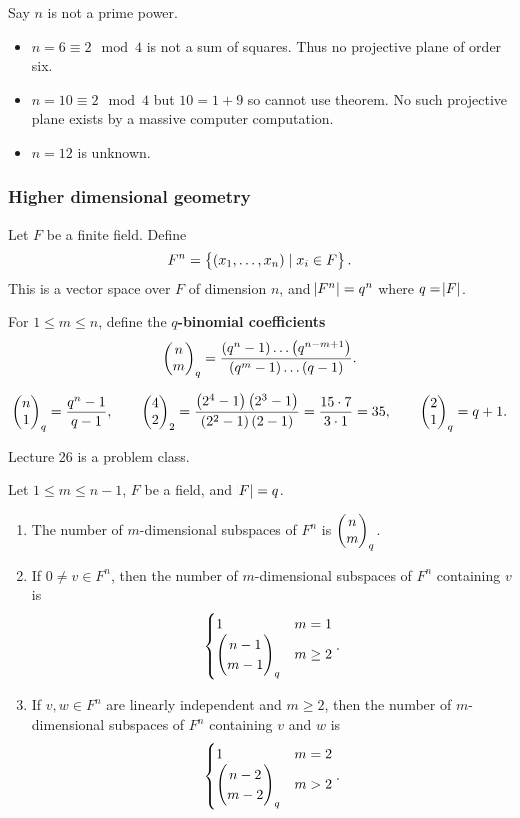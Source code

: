 \begin{example*}
Say $ n $ is not a prime power.
\begin{itemize}
\item $ n = 6 \equiv 2 \mod 4 $ is not a sum of squares. Thus no projective plane of order six.
\item $ n = 10 \equiv 2 \mod 4 $ but $ 10 = 1 + 9 $ so cannot use theorem. No such projective plane exists by a massive computer computation.
\item $ n = 12 $ is unknown.
\end{itemize}
\end{example*}

\pagebreak

\subsubsection{Higher dimensional geometry}

Let $ F $ be a finite field. Define
$$ F^n = \cbr{\br{x_1, \dots, x_n} \mid x_i \in F}. $$
This is a vector space over $ F $ of dimension $ n $, and $ \abs{F^n} = q^n $ where $ q = \abs{F} $.

\begin{definition*}
For $ 1 \le m \le n $, define the \textbf{$ q $-binomial coefficients}
$$ \twobyone{n}{m}_q = \dfrac{\br{q^n - 1} \dots \br{q^{n - m + 1}}}{\br{q^m - 1} \dots \br{q - 1}}. $$
\end{definition*}

\begin{example*}
$$ \twobyone{n}{1}_q = \dfrac{q^n - 1}{q - 1}, \qquad \twobyone{4}{2}_2 = \dfrac{\br{2^4 - 1}\br{2^3 - 1}}{\br{2^2 - 1}\br{2 - 1}} = \dfrac{15 \cdot 7}{3 \cdot 1} = 35, \qquad \twobyone{2}{1}_q = q + 1. $$
\end{example*}


Lecture 26 is a problem class.


\begin{proposition}
\label{prop:3.16}
Let $ 1 \le m \le n - 1 $, $ F $ be a field, and $ \abs{F} = q $.
\begin{enumerate}
\item The number of $ m $-dimensional subspaces of $ F^n $ is $ \begin{pmatrix} n \\ m \end{pmatrix}_q $.
\item If $ 0 \ne v \in F^n $, then the number of $ m $-dimensional subspaces of $ F^n $ containing $ v $ is
$$
\begin{cases}
1 & m = 1 \\
\begin{pmatrix} n - 1 \\ m - 1 \end{pmatrix}_q & m \ge 2
\end{cases}.
$$
\item If $ v, w \in F^n $ are linearly independent and $ m \ge 2 $, then the number of $ m $-dimensional subspaces of $ F^n $ containing $ v $ and $ w $ is
$$
\begin{cases}
1 & m = 2 \\
\begin{pmatrix} n - 2 \\ m - 2 \end{pmatrix}_q & m > 2
\end{cases}.
$$
\end{enumerate}
\end{proposition}

